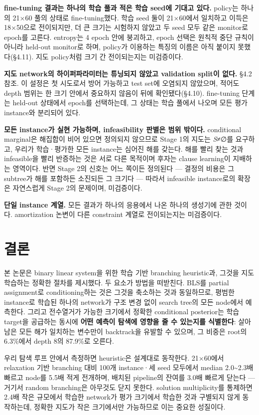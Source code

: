 \documentclass[final,5p,twocolumn]{elsarticle}
\begin{document}
\textbf{fine-tuning 결과는 하나의 학습 풀과 적은 학습 seed에 기대고 있다.} policy는 하나의 21×60 풀의 상태로 fine-tuning했다. 학습 seed 둘이 21×60에서 일치하고 이득은 18×50으로 전이되지만, 더 큰 크기는 시험하지 않았고 두 seed 모두 같은 monitor로 epoch를 고른다. entropy는 4 epoch 안에 붕괴하고, epoch 선택은 원칙적 중단 규칙이 아니라 held-out monitor로 하며, policy가 이용하는 특징의 이름은 아직 붙이지 못했다(§4.11). 지도 policy처럼 크기 간 전이되는지는 미검증이다.

\textbf{지도 network의 하이퍼파라미터는 튜닝되지 않았고 validation split이 없다.} §4.2 참조. 이 설정은 첫 시도로서 방어 가능하고 test set에 오염되지 않았으며, 적어도 depth 범위는 한 크기 안에서 중요하지 않음이 뒤에 확인됐다(§4.10). fine-tuning 단계는 held-out 상태에서 epoch를 선택하는데, 그 상태는 학습 풀에서 나오며 모든 평가 instance와 분리되어 있다.

\textbf{모든 instance가 실현 가능하며, infeasibility 판별은 범위 밖이다.} conditional marginal은 해집합이 비어 있으면 정의되지 않으므로 Stage 1의 지도는 \textit{S}≠∅를 요구하고, 우리가 학습·평가한 모든 instance는 심어진 해를 갖는다. 해를 빨리 찾는 것과 infeasible을 빨리 반증하는 것은 서로 다른 목적이며 후자는 clause learning이 지배하는 영역이다. 반면 Stage 2의 신호는 어느 쪽이든 정의된다 — 결정의 비용은 그 subtree가 해를 포함하든 소진되든 그 크기다 — 따라서 infeasible instance로의 확장은 자연스럽게 Stage 2의 문제이며, 미검증이다.

\textbf{단일 instance 계열.} 모든 결과가 하나의 응용에서 나온 하나의 생성기에 관한 것이다. amortization 논변이 다른 constraint 계열로 전이되는지는 미검증이다.

\section{결론}
본 논문은 binary linear system을 위한 학습 기반 branching heuristic과, 그것을 지도학습하는 정확한 절차를 제시했다. 두 요소가 방법을 떠받친다. BLS를 partial assignment로 conditioning하는 것은 그것을 축소하는 것과 동일하므로, 평범한 instance로 학습된 하나의 network가 구조 변경 없이 search tree의 모든 node에서 예측한다. 그리고 전수열거가 가능한 크기에서 정확한 conditional posterior는 학습 target을 공급하는 동시에 \textbf{어떤 예측이 탐색에 영향을 줄 수 있는지를 식별한다}: 살아남은 모든 해가 일치하는 변수만이 backtrack을 유발할 수 있으며, 그 비중은 root의 6.3\%에서 depth 8의 87.9\%로 오른다.

우리 탐색 루프 안에서 측정하면 heuristic은 설계대로 동작한다. 21×60에서 relaxation 기반 branching 대비 100개 instance·세 seed 모두에서 median 2.0\textasciitilde{}2.3배 빠르고 node를 5.5배 적게 전개하며, 배치된 pipeline의 잔여를 3.0배 빠르게 닫는다 — 거기서 random branching은 아무것도 닫지 못한다. solution multiplicity를 통제하면 2.4배 작은 규모에서 학습한 network가 평가 크기에서 학습한 것과 구별되지 않게 동작하는데, 정확한 지도가 작은 크기에서만 가능하므로 이는 중요한 성질이다.
\end{document}
